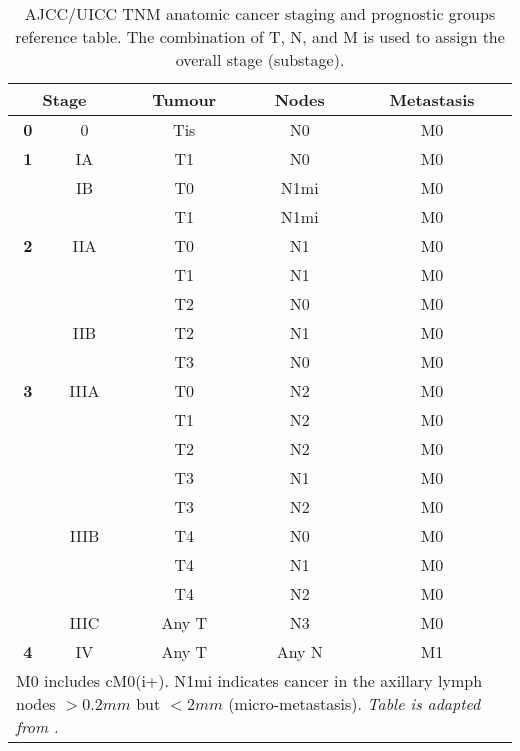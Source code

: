        \begin{table}[!h]
        \centering
        \tiny
        \caption{AJCC/UICC TNM anatomic cancer staging and prognostic groups reference table.  The combination of T, N, and M is used to assign the  overall stage (substage).}
        \label{table:tnmstage}
        \begin{tabular}{c|c|c|c|c}
        \multicolumn{2}{c|}{\textbf{\small Stage}} & \textbf{Tumour} & \textbf{Nodes} & \textbf{Metastasis} \\ \hline
        \textbf{0} & 0 & Tis & N0 & M0 \\ \hline
        \textbf{1} & IA & T1 & N0 & M0 \\ \hline
        \textbf{} & IB & T0 & N1mi & M0 \\ \cline{2-5} 
        \textbf{} &  & T1 & N1mi & M0 \\ \hline
        \textbf{2} & IIA & T0 & N1 & M0 \\ \hline
        \textbf{} &  & T1 & N1 & M0 \\ \cline{2-5} 
        \textbf{} &  & T2 & N0 & M0 \\ \cline{2-5} 
        \textbf{} & IIB & T2 & N1 & M0 \\ \cline{2-5} 
        \textbf{} &  & T3 & N0 & M0 \\ \hline
        \textbf{3} & IIIA & T0 & N2 & M0 \\ \hline
         &  & T1 & N2 & M0 \\ \cline{2-5} 
         &  & T2 & N2 & M0 \\ \cline{2-5} 
         &  & T3 & N1 & M0 \\ \cline{2-5} 
         &  & T3 & N2 & M0 \\ \cline{2-5} 
         & IIIB & T4 & N0 & M0 \\ \cline{2-5} 
         &  & T4 & N1 & M0 \\ \cline{2-5} 
         &  & T4 & N2 & M0 \\ \cline{2-5} 
         & IIIC & Any T & N3 & M0 \\ \hline
        \textbf{4} & IV & Any T & Any N & M1 \\ \hline
        
        \hline
        \multicolumn{5}{l}{%
          \begin{minipage}{5cm}%
            \tiny M0 includes cM0(i+). N1mi indicates cancer in the axillary lymph nodes  $>0.2mm$ but $<2mm$ (micro-metastasis). \textit{Table is adapted from \cite{Giuliano2017}.} 
          \end{minipage}%
        }\\
        \end{tabular}
        \end{table}


